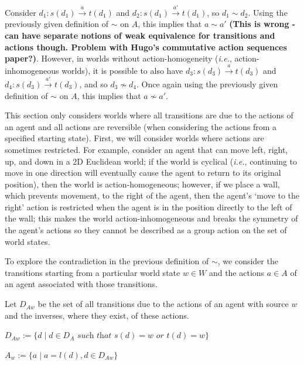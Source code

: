Consider $d_{1}: s(d_{1}) \xrightarrow{a} t(d_{1})$ and $d_{2}: s(d_{1}) \xrightarrow{a'} t(d_{1})$, so $d_{1} \sim d_{2}$.
Using the previously given definition of $\sim$ on $A$, this implies that $a \sim a'$ \textbf{(This is wrong - can have separate notions of weak equivalence for transitions and actions though. Problem with Hugo's commutative action sequences paper?)}.
However, in worlds without action-homogeneity (\textit{i.e.}, action-inhomogeneous worlds), it is possible to also have $d_{3}: s(d_{3}) \xrightarrow{a} t(d_{3})$ and $d_{4}: s(d_{3}) \xrightarrow{a'} t(d_{3})$, and so $d_{3} \not\sim d_{4}$.
Once again using the previously given definition of $\sim$ on $A$, this implies that $a \not\sim a'$.

This section only considers worlds where all transitions are due to the actions of an agent and all actions are reversible (when considering the actions from a specified starting state).
First, we will consider worlds where actions are sometimes restricted.
For example, consider an agent that can move left, right, up, and down in a 2D Euclidean world; if the world is cyclical (\textit{i.e.}, continuing to move in one direction will eventually cause the agent to return to its original position), then the world is action-homogeneous; however, if we place a wall, which prevents movement, to the right of the agent, then the agent's `move to the right' action is restricted when the agent is in the position directly to the left of the wall; this makes the world action-inhomogeneous and breaks the symmetry of the agent's actions so they cannot be described as a group action on the set of world states.

To explore the contradiction in the previous definition of $\sim$, we consider the transitions starting from a particular world state $w \in W$ and the actions $a \in A$ of an agent associated with those transitions.

\begin{definition}[$D_{w}$]
    Let $D_{A w}$ be the set of all transitions due to the actions of an agent with source $w$ and the inverses, where they exist, of these actions.
    
    $D_{A w} := \{d \mid d \in D_{A}\textit{ such that } s(d)=w\textit{ or }t(d)=w\}$
\end{definition}

\begin{definition}
    $A_{w} := \{a \mid a=l(d), d \in D_{A w}\}$
\end{definition}

